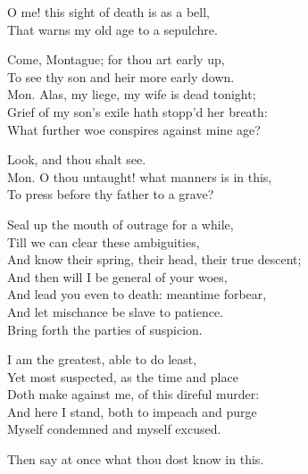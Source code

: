 \begin{speech}
O me! this sight of death is as a bell, \\
That warns my old age to a sepulchre. 
\\
\end{speech}
\begin{speech}
Come, Montague; for thou art early up, \\
To see thy son and heir more early down. \\
Mon. Alas, my liege, my wife is dead tonight; \\
Grief of my son's exile hath stopp'd her breath: \\
What further woe conspires against mine age? \\
\end{speech}
\begin{speech}
Look, and thou shalt see. \\
Mon. O thou untaught! what manners is in this, \\
To press before thy father to a grave? \\
\end{speech}
\begin{speech}
Seal up the mouth of outrage for a while, \\
Till we can clear these ambiguities, \\
And know their spring, their head, their true descent; \\
And then will I be general of your woes, \\
And lead you even to death: meantime forbear, \\
And let mischance be slave to patience. \\
Bring forth the parties of suspicion. \\
\end{speech}
\begin{speech}
I am the greatest, able to do least, \\
Yet most suspected, as the time and place \\
Doth make against me, of this direful murder: \\
And here I stand, both to impeach and purge \\
Myself condemned and myself excused. \\
\end{speech}
\begin{speech}
Then say at once what thou dost know in this. \\

\end{speech}
